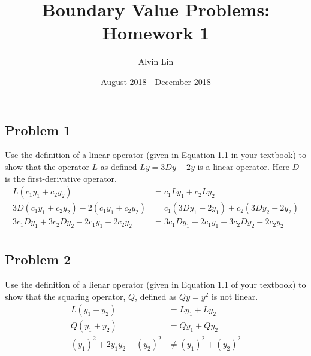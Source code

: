 \documentclass{math}
\title{Boundary Value Problems: Homework 1}
\author{Alvin Lin}
\date{August 2018 - December 2018}
\begin{document}
\maketitle

\subsection*{Problem 1}
Use the definition of a linear operator (given in Equation 1.1 in your textbook)
to show that the operator \( L \) as defined \( Ly = 3Dy-2y \) is a linear
operator. Here \( D \) is the first-derivative operator.
\begin{align*}
  L(c_1y_1+c_2y_2) &= c_1Ly_1+c_2Ly_2 \\
  3D(c_1y_1+c_2y_2)-2(c_1y_1+c_2y_2) &= c_1(3Dy_1-2y_1)+c_2(3Dy_2-2y_2) \\
  3c_1Dy_1+3c_2Dy_2-2c_1y_1-2c_2y_2 &= 3c_1Dy_1-2c_1y_1+3c_2Dy_2-2c_2y_2 \\
\end{align*}

\subsection*{Problem 2}
Use the definition of a lienar operator (given in Equation 1.1 of your textbook)
to show that the squaring operator, \( Q \), defined as \( Qy = y^2 \) is not
linear.
\begin{align*}
  L(y_1+y_2) &= Ly_1+Ly_2 \\
  Q(y_1+y_2) &= Qy_1+Qy_2 \\
  (y_1)^2+2y_1y_2+(y_2)^2 &\ne (y_1)^2+(y_2)^2 \\
\end{align*}
\end{document}
